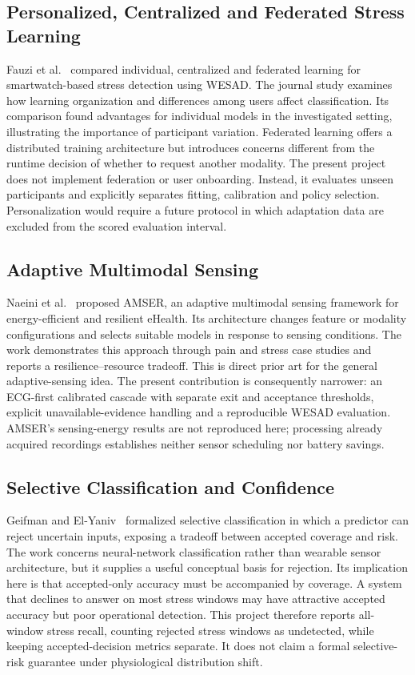 \documentclass[conference,a4paper]{IEEEtran}
\begin{document}
\subsection{Personalized, Centralized and Federated Stress Learning}
Fauzi et al.~\cite{fauzi2022} compared individual, centralized and federated learning for smartwatch-based stress detection using WESAD. The journal study examines how learning organization and differences among users affect classification. Its comparison found advantages for individual models in the investigated setting, illustrating the importance of participant variation. Federated learning offers a distributed training architecture but introduces concerns different from the runtime decision of whether to request another modality. The present project does not implement federation or user onboarding. Instead, it evaluates unseen participants and explicitly separates fitting, calibration and policy selection. Personalization would require a future protocol in which adaptation data are excluded from the scored evaluation interval.

\subsection{Adaptive Multimodal Sensing}
Naeini et al.~\cite{amser2022} proposed AMSER, an adaptive multimodal sensing framework for energy-efficient and resilient eHealth. Its architecture changes feature or modality configurations and selects suitable models in response to sensing conditions. The work demonstrates this approach through pain and stress case studies and reports a resilience--resource tradeoff. This is direct prior art for the general adaptive-sensing idea. The present contribution is consequently narrower: an ECG-first calibrated cascade with separate exit and acceptance thresholds, explicit unavailable-evidence handling and a reproducible WESAD evaluation. AMSER's sensing-energy results are not reproduced here; processing already acquired recordings establishes neither sensor scheduling nor battery savings.

\subsection{Selective Classification and Confidence}
Geifman and El-Yaniv~\cite{geifman2017} formalized selective classification in which a predictor can reject uncertain inputs, exposing a tradeoff between accepted coverage and risk. The work concerns neural-network classification rather than wearable sensor architecture, but it supplies a useful conceptual basis for rejection. Its implication here is that accepted-only accuracy must be accompanied by coverage. A system that declines to answer on most stress windows may have attractive accepted accuracy but poor operational detection. This project therefore reports all-window stress recall, counting rejected stress windows as undetected, while keeping accepted-decision metrics separate. It does not claim a formal selective-risk guarantee under physiological distribution shift.
\end{document}
